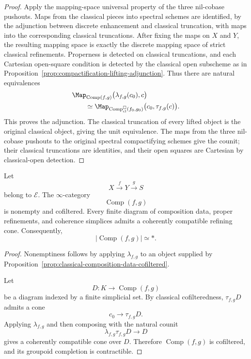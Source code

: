 \begin{proof}
Apply the mapping-space universal property of the three nil-cobase pushouts.
Maps from the classical pieces into spectral schemes are identified, by the
adjunction between discrete enhancement and classical truncation, with maps
into the corresponding classical truncations.  After fixing the maps on
\(X\) and \(Y\), the resulting mapping space is exactly the discrete mapping
space of strict classical refinements.  Properness is detected on classical
truncations, and each Cartesian open-square condition is detected by the
classical open subscheme as in
Proposition~\ref{prop:compactification-lifting-adjunction}.  Thus there are
natural equivalences
\[
\begin{aligned}
    &\Map_{\operatorname{Comp}(f,g)}
    \bigl(
      \lambda_{f,g}(c_0),c
    \bigr) \\
    &\qquad\simeq
    \Map_{\operatorname{Comp}^{\square}_{\mathrm{cl}}(f_0,g_0)}
    \bigl(
      c_0,\tau_{f,g}(c)
    \bigr).
\end{aligned}
\]
This proves the adjunction.  The classical truncation of every lifted object
is the original classical object, giving the unit equivalence.  The maps from
the three nil-cobase pushouts to the original spectral compactifying schemes
give the counit; their classical truncations are identities, and their open
squares are Cartesian by classical-open detection.
\end{proof}

\begin{proposition}
\label{prop:compactification-composition-data}
Let
\[
    X\xrightarrow{f}Y\xrightarrow{g}S
\]
belong to \(\mathcal E\).  The \(\infty\)-category
\[
    \operatorname{Comp}(f,g)
\]
is nonempty and cofiltered.  Every finite diagram of composition data,
proper refinements, and coherence simplices admits a coherently compatible
refining cone.  Consequently,
\[
    \bigl|
      \operatorname{Comp}(f,g)
    \bigr|
    \simeq
    *.
\]
\end{proposition}

\begin{proof}
Nonemptiness follows by applying \(\lambda_{f,g}\) to an object supplied by
Proposition~\ref{prop:classical-composition-data-cofiltered}.

Let
\[
    D:K\longrightarrow\operatorname{Comp}(f,g)
\]
be a diagram indexed by a finite simplicial set.  By classical
cofilteredness, \(\tau_{f,g}D\) admits a cone
\[
    c_0\longrightarrow\tau_{f,g}D.
\]
Applying \(\lambda_{f,g}\) and then composing with the natural counit
\[
    \lambda_{f,g}\tau_{f,g}D
    \longrightarrow
    D
\]
gives a coherently compatible cone over \(D\).  Therefore
\(\operatorname{Comp}(f,g)\) is cofiltered, and its groupoid completion is
contractible.
\end{proof}

